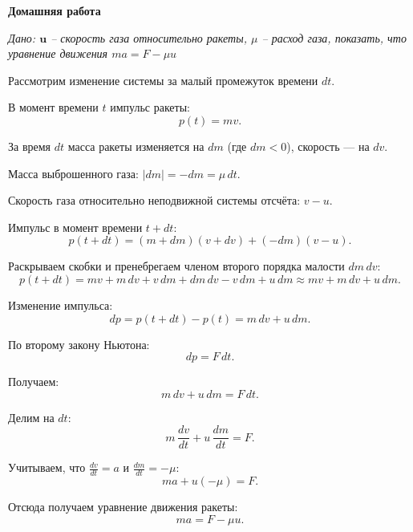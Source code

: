 \documentclass[a4paper,12pt]{article}
\begin{document}
\begin{center}
    \textbf{Домашняя работа }
\end{center}

\textit{Дано: $\textbf{u}$ -- скорость газа относительно ракеты, $\mu$ -- расход газа, показать, что уравнение движения $ma = F - \mu u$ }

\vspace{2em}
Рассмотрим изменение системы за малый промежуток времени $dt$.

В момент времени $t$ импульс ракеты:
\[
p(t) = mv.
\]

За время $dt$ масса ракеты изменяется на $dm$ (где $dm < 0$), скорость --- на $dv$. 

\vspace{1em}
Масса выброшенного газа: $|dm| = -dm = \mu\,dt$.

\vspace{1em}
Скорость газа относительно неподвижной системы отсчёта: $v - u$.

\vspace{1em}
Импульс в момент времени $t + dt$:
\[
p(t+dt) = (m + dm)(v + dv) + (-dm)(v - u).
\]

Раскрываем скобки и пренебрегаем членом второго порядка малости $dm\,dv$:
\[
p(t+dt) = mv + m\,dv + v\,dm + dm\,dv - v\,dm + u\,dm \approx mv + m\,dv + u\,dm.
\]

Изменение импульса:
\[
dp = p(t+dt) - p(t) = m\,dv + u\,dm.
\]

По второму закону Ньютона:
\[
dp = F\,dt.
\]

Получаем:
\[
m\,dv + u\,dm = F\,dt.
\]

Делим на $dt$:
\[
m\,\frac{dv}{dt} + u\,\frac{dm}{dt} = F.
\]

Учитываем, что $\displaystyle\frac{dv}{dt} = a$ и $\displaystyle\frac{dm}{dt} = -\mu$:
\[
ma + u(-\mu) = F.
\]

Отсюда получаем уравнение движения ракеты:
\[
\boxed{ma = F - \mu u.}
\]
\end{document}
